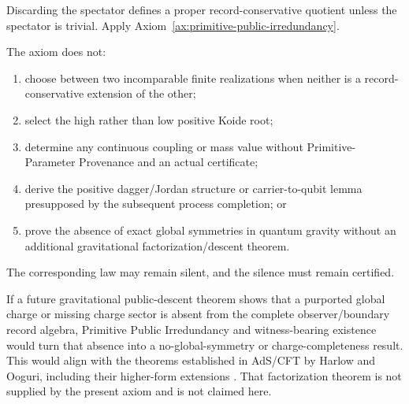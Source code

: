 \begin{proofsketch}
Discarding the spectator defines a proper record-conservative quotient unless the
spectator is trivial.  Apply Axiom~\ref{ax:primitive-public-irredundancy}.
\end{proofsketch}

\begin{proposition}
\label{prop:ppi-boundary}
The axiom does not:
\begin{enumerate}[label=\textup{(\roman*)},leftmargin=2.2em]
\item choose between two incomparable finite realizations when neither is a
      record-conservative extension of the other;
\item select the high rather than low positive Koide root;
\item determine any continuous coupling or mass value without
      Primitive-Parameter Provenance and an actual certificate;
\item derive the positive dagger/Jordan structure or carrier-to-qubit lemma presupposed by the subsequent process completion; or
\item prove the absence of exact global symmetries in quantum gravity without an
      additional gravitational factorization/descent theorem.
\end{enumerate}
The corresponding law may remain silent, and the silence must remain certified.
\end{proposition}

\begin{remark}
If a future gravitational public-descent theorem shows that a purported global
charge or missing charge sector is absent from the complete observer/boundary record
algebra, Primitive Public Irredundancy and witness-bearing existence would turn that
absence into a no-global-symmetry or charge-completeness result.  This would align
with the theorems established in AdS/CFT by Harlow and Ooguri, including their
higher-form extensions \cite{harlow-ooguri-letter,harlow-ooguri-full}.  That
factorization theorem is not supplied by the present axiom and is not claimed here.
\end{remark}

